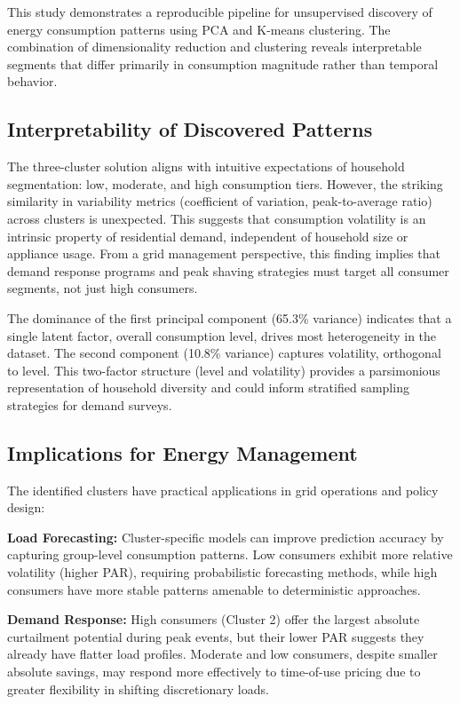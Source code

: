 \documentclass[11pt]{article}
\begin{document}
This study demonstrates a reproducible pipeline for unsupervised discovery of energy consumption patterns using PCA and K-means clustering. The combination of dimensionality reduction and clustering reveals interpretable segments that differ primarily in consumption magnitude rather than temporal behavior.

\subsection{Interpretability of Discovered Patterns}

The three-cluster solution aligns with intuitive expectations of household segmentation: low, moderate, and high consumption tiers. However, the striking similarity in variability metrics (coefficient of variation, peak-to-average ratio) across clusters is unexpected. This suggests that consumption volatility is an intrinsic property of residential demand, independent of household size or appliance usage. From a grid management perspective, this finding implies that demand response programs and peak shaving strategies must target all consumer segments, not just high consumers.

The dominance of the first principal component (65.3\% variance) indicates that a single latent factor, overall consumption level, drives most heterogeneity in the dataset. The second component (10.8\% variance) captures volatility, orthogonal to level. This two-factor structure (level and volatility) provides a parsimonious representation of household diversity and could inform stratified sampling strategies for demand surveys.

\subsection{Implications for Energy Management}

The identified clusters have practical applications in grid operations and policy design:

\textbf{Load Forecasting:} Cluster-specific models can improve prediction accuracy by capturing group-level consumption patterns. Low consumers exhibit more relative volatility (higher PAR), requiring probabilistic forecasting methods, while high consumers have more stable patterns amenable to deterministic approaches.

\textbf{Demand Response:} High consumers (Cluster 2) offer the largest absolute curtailment potential during peak events, but their lower PAR suggests they already have flatter load profiles. Moderate and low consumers, despite smaller absolute savings, may respond more effectively to time-of-use pricing due to greater flexibility in shifting discretionary loads.
\end{document}

